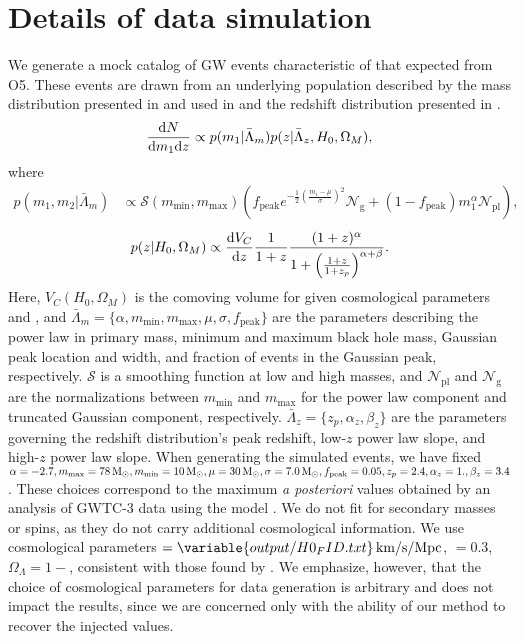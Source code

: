 \documentclass[]{aastex631}
\begin{document}

\appendix
\section{Details of data simulation}
\label{ap:data generation}

We generate a mock catalog of \ac{GW} events characteristic of that expected from \acf{O5}. 
These events are drawn from an underlying population described by the \plp{} mass distribution presented in \citet{talbot} and used in \citet{abbot_1 abbot2} and the redshift distribution presented in \citet{callister_shouts_2020}.
\begin{equation}
\label{eq:underlying population}
    \frac{\diff N}{\diff m_1 \diff z} \propto p(m_1|\bar{\Lambda}_m) p(z|\bar{\Lambda}_z, H_0, \Omega_M),
\end{equation}
where 
\begin{align}
    p(m_1,m_2|\bar{\Lambda}_m) &\propto \mathcal{S}(m_{\min},m_{\max})
    \left( f_{\text{peak}}e^{-\frac{1}{2}(\frac{m_1-\mu}{\sigma})^2}\mathcal{N}_{\text{g}} +
    (1-f_{\text{peak}})m_1^{\alpha}\mathcal{N}_{\text{pl}} \right) ,
\label{eq:underlying mass dist}
\end{align}
\begin{equation}
    p(z|H_0, \Omega_M) \propto \frac{\diff V_C}{\diff z} \frac{1}{1+z} \frac{(1+z)^\alpha}{1+\left(\frac{1+z}{1+z_p}\right)^{\alpha+\beta}}.
    \label{eq:underlying redshift dist}
\end{equation}
Here, $V_C(H_0, \Omega_M)$ is the comoving volume for given cosmological parameters \Ho{} and \Omm{}, and $\bar{\Lambda}_m = \{\alpha, m_{\min}, m_{\max}, \mu, \sigma, f_{\text{peak}}\}$ are the parameters describing the power law in primary mass, minimum and maximum black hole mass, Gaussian peak location and width, and fraction of events in the Gaussian peak, respectively.
$\mathcal{S}$ is a smoothing function at low and high masses, and $\mathcal{N}_{\text{pl}}$ and $\mathcal{N}_{\text{g}}$ are the normalizations between  $m_{\min}$ and $m_{\max}$ for the power law component and truncated Gaussian component, respectively.
$\bar{\Lambda}_z = \{z_p,\alpha_z,\beta_z\}$ are the parameters governing the redshift distribution's peak redshift, low-$z$ power law slope, and high-$z$ power law slope.
When generating the simulated events, we have fixed $\alpha=-2.7,m_{\max}=78\,\text{M}_{\odot},m_{\min}=10\,\text{M}_{\odot}, \mu=30\,\text{M}_{\odot},\sigma=7.0\,\text{M}_{\odot}, f_{\text{peak}}=0.05,   z_p=2.4,\alpha_z=1.,\beta_z=3.4$.
These choices correspond to the maximum \emph{a posteriori} values obtained by an analysis of GWTC-3 data using the \plp{} model \citep{o3b_pop}.
We do not fit for secondary masses or spins, as they do not carry additional cosmological information.
We use cosmological parameters \Ho$=\variable{output/H0_FID.txt}\Hunits$, \Omm$=0.3$, $\Omega_\Lambda=1-$\Omm, consistent with those found by \citet{planck_collaboration_planck_2016}.
We emphasize, however, that the choice of cosmological parameters for data generation is arbitrary and does not impact the results, since we are concerned only with the ability of our method to recover the injected values.
\end{document}
